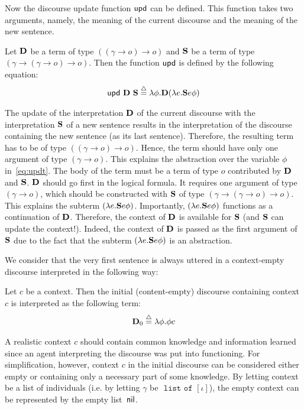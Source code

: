 Now the discourse update function $\updt$ can be defined. This function takes two arguments, namely, the meaning of the current discourse and the meaning of the new sentence.
\begin{definition} Let $\D$ be a term of type $( (\gamma \rightarrow o) \rightarrow o)$ and $\S$ be a term of type $(\gamma \rightarrow (\gamma \rightarrow o) \rightarrow o)$. Then the function $ \updt$ is defined by the following equation:
\begin{align} %
 \updt \ \D \ \S \defeq  \lambda \phi.   \D (\lambda e. \S e \phi) \label{eq:updt}
\end{align} \label{def:updt-prelim}
\end{definition}
The update of the interpretation $\D$ of the current discourse with the interpretation $\S$ of a new sentence results in the interpretation of the discourse containing the new sentence (as its last sentence). Therefore, the resulting term has to be of type $((\gamma \rightarrow o) \rightarrow o)$. Hence, the term should have only one argument of type $(\gamma \rightarrow o)$. This explains the abstraction over the variable $\phi$ in~\eqref{eq:updt}. The body of the term must be a term of type $o$ contributed by $\D$ and $\S$. $\D$ should go first in the logical formula. It requires one argument of type $(\gamma \rightarrow o)$, which should be constructed with $\S$ of type $(\gamma \rightarrow (\gamma \rightarrow o) \rightarrow o)$. This explains the subterm $(\lambda e. \S e \phi) $. Importantly, $(\lambda e. \S e \phi) $ functions as a continuation of $\D$. Therefore, the context of $\D$ is available for $\S$ (and $\S$ can update the context!). Indeed, the context of $\D$ is passed as the first argument of $\S$ due to the fact that the subterm $(\lambda e. \S e \phi) $ is an abstraction.

We consider that the very first sentence is always uttered in a context-empty discourse interpreted in the following way:
\begin{definition} Let $c$ be a context. Then the initial (content-empty) discourse containing context $c$ is interpreted as the following term:
\begin{align}
\D_0 \defeq \lambda \phi. \phi c \label{eq:D0}
\end{align}
\end{definition}

A realistic context $c$ should contain common knowledge and information learned since an agent interpreting the discourse was put into functioning. For simplification, however, context $c$ in the initial discourse can be considered either empty or containing only a necessary part of some knowledge. By letting context be a list of individuals (i.e. by letting $\gamma$ be $\texttt{ list of } [  \iota  ]$), the empty context can be represented by the empty list~$\nil$.

